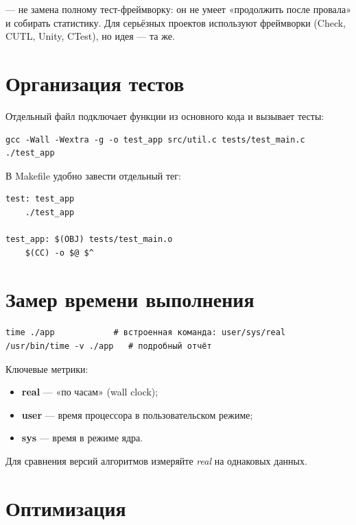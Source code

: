 \begin{tipbox}
 --- не замена полному тест-фреймворку: он
не умеет «продолжить после провала» и собирать статистику.
Для серьёзных проектов используют фреймворки (Check,
CUTL, Unity, CTest), но идея --- та же.
\end{tipbox}

\section{Организация тестов}

Отдельный файл  подключает
функции из основного кода и вызывает тесты:
\begin{verbatim}
gcc -Wall -Wextra -g -o test_app src/util.c tests/test_main.c
./test_app
\end{verbatim}

В Makefile удобно завести отдельный тег:
\begin{verbatim}
test: test_app
    ./test_app

test_app: $(OBJ) tests/test_main.o
    $(CC) -o $@ $^
\end{verbatim}

\section{Замер времени выполнения}

\begin{verbatim}
time ./app            # встроенная команда: user/sys/real
/usr/bin/time -v ./app   # подробный отчёт
\end{verbatim}

Ключевые метрики:
\begin{itemize}
  \item \textbf{real} --- «по часам» (wall clock);
  \item \textbf{user} --- время процессора в пользовательском
    режиме;
  \item \textbf{sys} --- время в режиме ядра.
\end{itemize}

Для сравнения версий алгоритмов измеряйте \emph{real} на
однаковых данных.

\section{Оптимизация}

